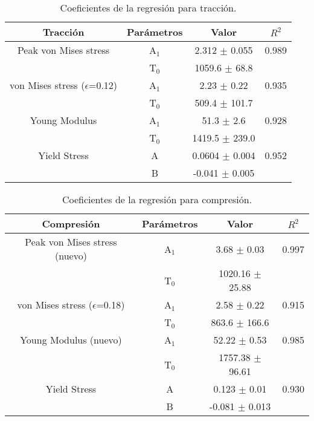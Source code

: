 
\begin{table}[htp]
\caption[Coeficientes de la regresión para tracción.]{Coeficientes de la regresión para tracción.}
\begin{center}
\begin{tabular}{*{4}{c}}
\hline
\textbf{Tracción} & Parámetros & Valor & $R^{2}$ \\ \hline \hline
Peak von Mises stress & A$_{1}$ & 2.312 $\pm$ 0.055 & 0.989 \\
 & T$_{0}$ & 1059.6 $\pm$ 68.8 & \\ \hline
von Mises stress ($\epsilon$=0.12) & A$_{1}$ & 2.23 $\pm$ 0.22 & 0.935 \\
 & T$_{0}$ & 509.4 $\pm$ 101.7 & \\ \hline
Young Modulus & A$_{1}$ & 51.3 $\pm$ 2.6 & 0.928 \\
 & T$_{0}$ & 1419.5 $\pm$ 239.0 & \\ \hline
Yield Stress & A & 0.0604 $\pm$ 0.004 & 0.952 \\
 & B & -0.041 $\pm$ 0.005 & \\ \hline
\end{tabular}
\end{center}
\label{C3:tb:initPropsTen}
\end{table}

\begin{table}[htp]
\caption[Coeficientes de la regresión para compresión.]{Coeficientes de la regresión para compresión.}
\begin{center}
\begin{tabular}{*{4}{c}}
\hline
\textbf{Compresión} & Parámetros & Valor & $R^{2}$ \\ \hline \hline
Peak von Mises stress (nuevo) & A$_{1}$ & 3.68 $\pm$ 0.03 & 0.997 \\
 & T$_{0}$ & 1020.16 $\pm$ 25.88 & \\ \hline
von Mises stress ($\epsilon$=0.18) & A$_{1}$ & 2.58 $\pm$ 0.22 & 0.915 \\
 & T$_{0}$ & 863.6 $\pm$ 166.6 & \\ \hline
Young Modulus (nuevo) & A$_{1}$ & 52.22 $\pm$ 0.53 & 0.985 \\
 & T$_{0}$ & 1757.38 $\pm$ 96.61 & \\ \hline
Yield Stress & A & 0.123 $\pm$ 0.01 & 0.930 \\
 & B & -0.081 $\pm$ 0.013 & \\ \hline
\end{tabular}
\end{center}
\label{C3:tb:initPropsComp}
\end{table}

